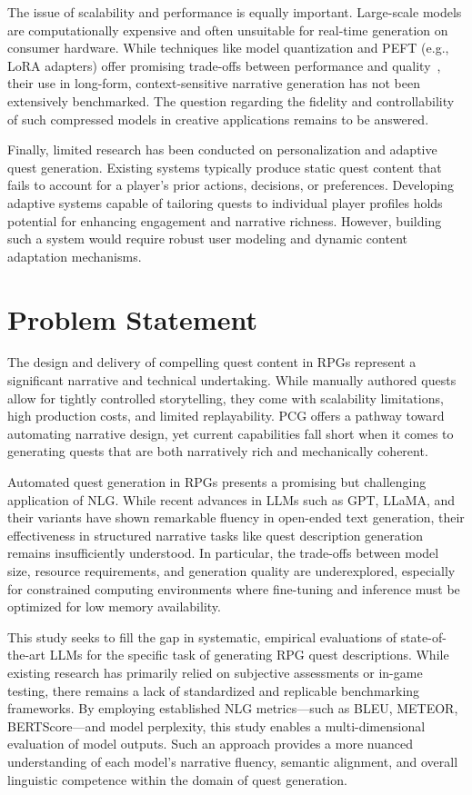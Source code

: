 The issue of scalability and performance is equally important. Large-scale models
are computationally expensive and often unsuitable for real-time generation on consumer
hardware. While techniques like model quantization and PEFT (e.g., LoRA adapters)
offer promising trade-offs between performance and quality~\cite{hu2022lora}, their use in long-form,
context-sensitive narrative generation has not been extensively benchmarked. The question
regarding the fidelity and controllability of such compressed models in creative applications
remains to be answered.

Finally, limited research has been conducted on personalization and adaptive quest
generation. Existing systems typically produce static quest content that fails to account
for a player's prior actions, decisions, or preferences. Developing adaptive systems capable
of tailoring quests to individual player profiles holds potential for enhancing engagement
and narrative richness. However, building such a system would require robust user modeling
and dynamic content adaptation mechanisms.

\section{Problem Statement}

The design and delivery of compelling quest content in RPGs represent a significant
narrative and technical undertaking. While manually authored quests allow for tightly
controlled storytelling, they come with scalability limitations, high production costs, and
limited replayability. PCG offers a pathway toward automating narrative design, yet
current capabilities fall short when it comes to generating quests that are both narratively
rich and mechanically coherent.

Automated quest generation in RPGs presents a promising but challenging application
of NLG. While recent advances in LLMs such as GPT, LLaMA, and their variants have
shown remarkable fluency in open-ended text generation, their effectiveness in structured
narrative tasks like quest description generation remains insufficiently understood. In particular,
the trade-offs between model size, resource requirements, and generation quality
are underexplored, especially for constrained computing environments where fine-tuning
and inference must be optimized for low memory availability.

This study seeks to fill the gap in systematic, empirical evaluations of state-of-the-art
LLMs for the specific task of generating RPG quest descriptions. While existing research
has primarily relied on subjective assessments or in-game testing, there remains a lack
of standardized and replicable benchmarking frameworks. By employing established
NLG metrics—such as BLEU, METEOR, BERTScore—and model perplexity, this study
enables a multi-dimensional evaluation of model outputs. Such an approach provides a
more nuanced understanding of each model's narrative fluency, semantic alignment, and
overall linguistic competence within the domain of quest generation.

